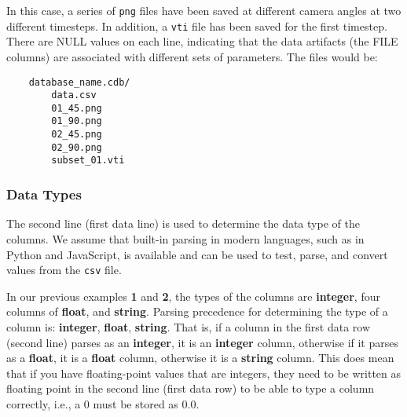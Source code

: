 \noindent
In this case, a series of \texttt{\small png} files have been saved at different
camera angles at two different timesteps. In addition, a \texttt{\small vti}
file has been saved for the first timestep. There are NULL values on each line,
indicating that the data artifacts (the FILE columns) are associated with
different sets of parameters. The files would be:

\begin{verbatim}
    database_name.cdb/
        data.csv
        01_45.png
        01_90.png
        02_45.png
        02_90.png
        subset_01.vti
\end{verbatim}

\subsubsection{Data Types}

The second line (first data line) is used to determine the data type of the
columns.  We assume that built-in parsing in modern languages, such as in
Python and JavaScript, is available and can be used to test, parse, and convert 
values from the \texttt{\small csv} file.

In our previous examples {\bf 1} and {\bf 2}, the types of the columns are 
\textbf{integer}, four columns of \textbf{float}, and \textbf{string}. Parsing
precedence for determining the type of a column is: \textbf{integer},
\textbf{float}, \textbf{string}. That is, if a column in the first data row
(second line) parses as an \textbf{integer}, it is an \textbf{integer}
column, otherwise if it parses as a \textbf{float}, it is a \textbf{float}
column, otherwise it is a \textbf{string} column. This does mean that
if you have floating-point values that are integers, they need to be
written as floating point in the second line (first data row) to be able to 
type a column correctly, i.e., a 0 must be stored as 0.0.


